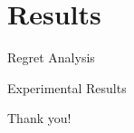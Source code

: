 \documentclass[10pt, xcolor=x11names,compress]{beamer}
\begin{document}
\section{Results}

\begin{frame}{Regret Analysis}

\end{frame}

\begin{frame}{Experimental Results}

\end{frame}

\begin{frame}
 \begin{center}
		{\Huge Thank you!}\\
		
	\end{center}
\end{frame}
\end{document}

